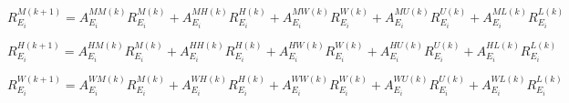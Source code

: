 
\begin{equation}
R_{{E_{i}}}^{M(k+1)} = A_{E_{i}}^{MM(k)}R_{{E_{i}}}^{M(k)} + A_{E_{i}}^{MH(k)}R_{{E_{i}}}^{H(k)} + A_{E_{i}}^{MW(k)}R_{{E_{i}}}^{W(k)}+ A_{E_{i}}^{MU(k)}R_{{E_{i}}}^{U(k)} + A_{E_{i}}^{ML(k)}R_{{E_{i}}}^{L(k)}
\end{equation}


\begin{equation}
R_{{E_{i}}}^{H(k+1)} = A_{E_{i}}^{HM(k)}R_{{E_{i}}}^{M(k)} + A_{E_{i}}^{HH(k)}R_{{E_{i}}}^{H(k)} + A_{E_{i}}^{HW(k)}R_{{E_{i}}}^{W(k)}+ A_{E_{i}}^{HU(k)}R_{{E_{i}}}^{U(k)} + A_{E_{i}}^{HL(k)}R_{{E_{i}}}^{L(k)}
\end{equation}




\begin{equation}
R_{{E_{i}}}^{W(k+1)} = A_{E_{i}}^{WM(k)}R_{{E_{i}}}^{M(k)} + A_{E_{i}}^{WH(k)}R_{{E_{i}}}^{H(k)} + A_{E_{i}}^{WW(k)}R_{{E_{i}}}^{W(k)}+ A_{E_{i}}^{WU(k)}R_{{E_{i}}}^{U(k)} + A_{E_{i}}^{WL(k)}R_{{E_{i}}}^{L(k)}
\end{equation}


